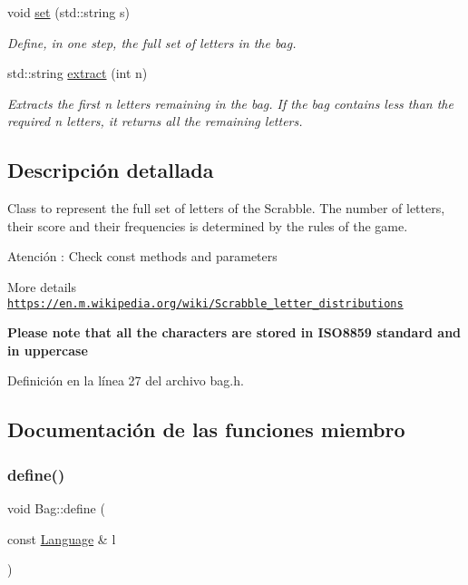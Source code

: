 \begin{DoxyCompactItemize}
void \hyperlink{classBag_a3de5aa1629a7fdd40630d140adde2757}{set} (std\+::string s)
\begin{DoxyCompactList}\small\item\em Define, in one step, the full set of letters in the bag. \end{DoxyCompactList}\item 
std\+::string \hyperlink{classBag_ac75abe2b7626e50109a1add3382978af}{extract} (int n)
\begin{DoxyCompactList}\small\item\em Extracts the first {\ttfamily n} letters remaining in the bag. If the bag contains less than the required {\ttfamily n} letters, it returns all the remaining letters. \end{DoxyCompactList}\end{DoxyCompactItemize}


\subsection{Descripción detallada}
Class to represent the full set of letters of the Scrabble. The number of letters, their score and their frequencies is determined by the rules of the game. 

\begin{DoxyWarning}{Atención}
\+: Check const methods and parameters
\end{DoxyWarning}
More details \href{https://en.m.wikipedia.org/wiki/Scrabble_letter_distributions}{\tt https\+://en.\+m.\+wikipedia.\+org/wiki/\+Scrabble\+\_\+letter\+\_\+distributions}

{\bfseries Please note that all the characters are stored in I\+S\+O8859 standard and in uppercase} 

Definición en la línea 27 del archivo bag.\+h.



\subsection{Documentación de las funciones miembro}
\mbox{\label{classBag_ad380d36f2628b3ffe0ca19cfe53d7c19}} 
\subsubsection{\texorpdfstring{define()}{define()}}
{\footnotesize\ttfamily void Bag\+::define (\begin{DoxyParamCaption}\item[{const \hyperlink{classLanguage}{Language} \&}]{l }\end{DoxyParamCaption})}



